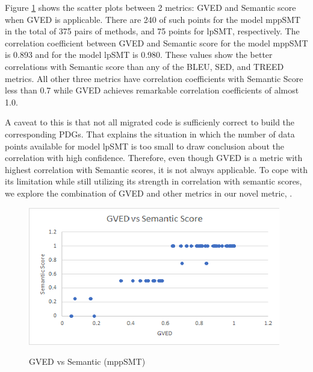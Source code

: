 
Figure \ref{fig:GVEDmppSMT} shows the scatter plots between 2 metrics:
GVED and Semantic score when GVED is applicable. There are 240 of such
points for the model mppSMT in the total of 375 pairs of methods, and
75 points for lpSMT, respectively. The correlation coefficient between
GVED and Semantic score for the model mppSMT is 0.893 and for the
model lpSMT is 0.980. These values show the better correlations with
Semantic score than any of the BLEU, SED, and TREED metrics.
%
%
All other three metrics have correlation coefficients with Semantic
Score less than 0.7 while GVED achieves remarkable correlation
coefficients of almost 1.0. 
%
%

A caveat to this is that not all migrated code is sufficienly correct
to build the corresponding PDGs.
%
That explains the situation in which the number of data points
available for model lpSMT is too small to draw conclusion about the
correlation with high confidence. Therefore, even though GVED is a
metric with highest correlation with Semantic scores, it is not always
applicable. To cope with its limitation while still utilizing its
strength in correlation with semantic scores, we explore the
combination of GVED and other metrics in our novel metric, {\model}.


%
\begin{figure}
\caption{GVED vs Semantic (mppSMT)}
\centering
\includegraphics{img/gved_mppSMT.png}
\label{fig:GVEDmppSMT}
\end{figure}
